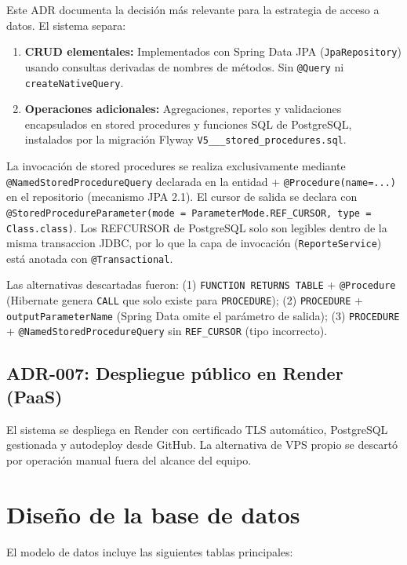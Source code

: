 \label{sec:adr006}

Este ADR documenta la decisión más relevante para la estrategia de acceso a datos. El sistema separa:

\begin{enumerate}
  \item \textbf{CRUD elementales:} Implementados con Spring Data JPA (\texttt{JpaRepository}) usando consultas derivadas de nombres de métodos. Sin \texttt{@Query} ni \texttt{createNativeQuery}.
  \item \textbf{Operaciones adicionales:} Agregaciones, reportes y validaciones encapsulados en stored procedures y funciones SQL de PostgreSQL, instalados por la migración Flyway \texttt{V5\_\_\_stored\_procedures.sql}.
\end{enumerate}

La invocación de stored procedures se realiza exclusivamente mediante \texttt{@NamedStoredProcedureQuery} declarada en la entidad + \texttt{@Procedure(name=...)} en el repositorio (mecanismo JPA 2.1). El cursor de salida se declara con \texttt{@StoredProcedureParameter(mode = ParameterMode.REF\_CURSOR, type = Class.class)}. Los REFCURSOR de PostgreSQL solo son legibles dentro de la misma transaccion JDBC, por lo que la capa de invocación (\texttt{ReporteService}) está anotada con \texttt{@Transactional}.

Las alternativas descartadas fueron: (1) \texttt{FUNCTION RETURNS TABLE} + \texttt{@Procedure} (Hibernate genera \texttt{CALL} que solo existe para \texttt{PROCEDURE}); (2) \texttt{PROCEDURE} + \texttt{outputParameterName} (Spring Data omite el parámetro de salida); (3) \texttt{PROCEDURE} + \texttt{@NamedStoredProcedureQuery} sin \texttt{REF\_CURSOR} (tipo incorrecto).

\subsection{ADR-007: Despliegue público en Render (PaaS)}

El sistema se despliega en Render con certificado TLS automático, PostgreSQL gestionada y autodeploy desde GitHub. La alternativa de VPS propio se descartó por operación manual fuera del alcance del equipo.

\section{Diseño de la base de datos}
\label{sec:diseno-bd}

El modelo de datos incluye las siguientes tablas principales:

